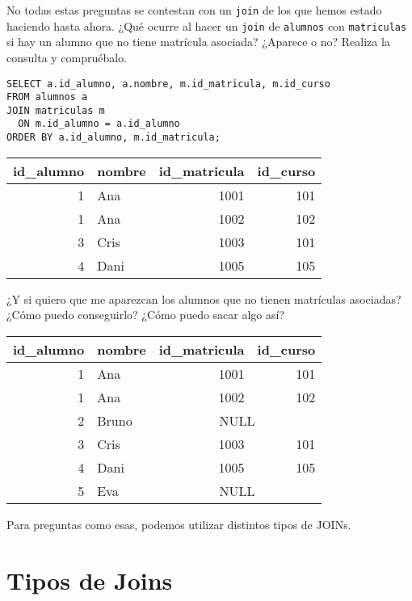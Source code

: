 \documentclass[11pt,a4paper]{article}
\begin{document}
No todas estas preguntas se contestan con un \texttt{join} de los que hemos estado haciendo hasta ahora. 
%
¿Qué ocurre al hacer un \texttt{join} de \texttt{alumnos} con \texttt{matriculas} si hay un alumno que no tiene matrícula asociada? ¿Aparece o no? 
%
Realiza la consulta y compruébalo.


\begin{lstlisting}
SELECT a.id_alumno, a.nombre, m.id_matricula, m.id_curso
FROM alumnos a
JOIN matriculas m
  ON m.id_alumno = a.id_alumno
ORDER BY a.id_alumno, m.id_matricula;
\end{lstlisting}

\begin{center}
\begin{tabular}{r l r r}
\toprule
id\_alumno & nombre & id\_matricula & id\_curso \\
\midrule
1 & Ana  & 1001 & 101 \\
1 & Ana  & 1002 & 102 \\
3 & Cris & 1003 & 101 \\
4 & Dani & 1005 & 105 \\
\bottomrule
\end{tabular}
\end{center}


¿Y si quiero que me aparezcan los alumnos que no tienen matrículas asociadas? ¿Cómo puedo conseguirlo?  ¿Cómo puedo sacar algo así?

\begin{center}
\begin{tabular}{r l r r}
\toprule
id\_alumno & nombre & id\_matricula & id\_curso \\
\midrule
1 & Ana   & 1001 & 101 \\
1 & Ana   & 1002 & 102 \\
2 & Bruno & \multicolumn{2}{c}{NULL} \\
3 & Cris  & 1003 & 101 \\
4 & Dani  & 1005 & 105 \\
5 & Eva   & \multicolumn{2}{c}{NULL} \\
\bottomrule
\end{tabular}
\end{center}

Para preguntas como esas, podemos utilizar distintos tipos de JOINs.

\section{Tipos de Joins}
\end{document}
